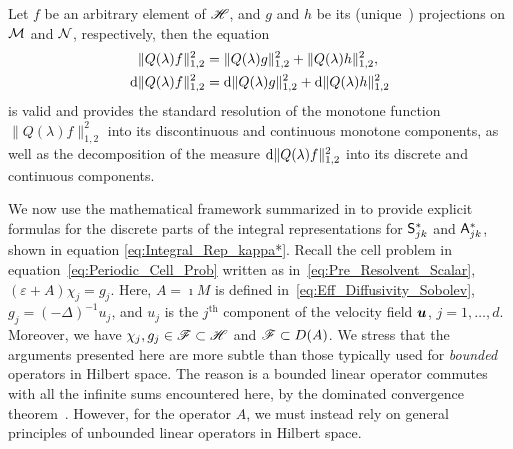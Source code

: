 \documentclass[amsa]{ipart}
\begin{document}
\begin{theorem}
Let $f$ be an arbitrary element of $\mathscr{H}$, and $g$ and $h$ be its
(unique~\cite{Folland:99:RealAnalysis}) 
projections on $\mathcal{M}$ and $\mathcal{N}$, respectively, then the equation
%
\begin{align}\label{eq:Disc_Cont_Measures}
  \|Q(\lambda)f\|_{1,2}^2&=\|Q(\lambda)g\|_{1,2}^2+\|Q(\lambda)h\|_{1,2}^2,
  \\
  \d\|Q(\lambda)f\|_{1,2}^2&=\d\|Q(\lambda)g\|_{1,2}^2+\d\|Q(\lambda)h\|_{1,2}^2
  \notag
\end{align}
%
is valid and provides the standard resolution of the monotone function
$\|Q(\lambda)f\|_{1,2}^2$ into its discontinuous and continuous monotone
components, as well as the decomposition of the measure
$\mathrm{d}\|Q(\lambda)f\|_{1,2}^2$ into its discrete and continuous components.  
\end{theorem}
%






We now use the mathematical framework summarized in
 to provide explicit formulas for the
discrete parts of the integral representations for $\mathsf{S}^*_{jk}$
and $\mathsf{A}^*_{jk}$, shown in equation
\eqref{eq:Integral_Rep_kappa*}. Recall the cell problem
in equation~\eqref{eq:Periodic_Cell_Prob} written as
in~\eqref{eq:Pre_Resolvent_Scalar}, $(\varepsilon+A)\chi_j=g_j$. Here, $A=\imath M$ 
is defined in~\eqref{eq:Eff_Diffusivity_Sobolev}, $g_j=(-\Delta)^{-1}u_j$,
and $u_j$ is the $j^{\text{th}}$ component of the velocity field
$\boldsymbol{u}$, $j=1,\ldots,d$. Moreover, we have $\chi_j,g_j\in\mathscr{F}\subset\mathscr{H}$ and $\mathscr{F}\subset
D(A)$. We stress that the arguments presented here are more subtle
than those typically used for \emph{bounded} operators in Hilbert
space. The reason is a bounded linear operator commutes with all
the infinite sums encountered here, by the dominated convergence
theorem~\cite{Folland:99:RealAnalysis}. However, for the operator $A$,
we must instead rely on general principles of unbounded linear operators in
Hilbert space.  
\end{document}

